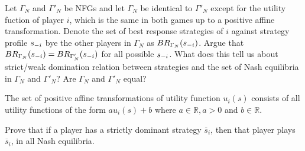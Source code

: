 \documentclass[../main.tex]{subfiles}
\begin{document}
\begin{solution}

\end{solution}

\begin{question}
Let $\Gamma_N$ and $\Gamma'_N$ be NFGs and let $\Gamma_N$  be identical to $\Gamma'_N$ except for the utility fuction of player $i$, which is the same in both games up to a positive affine transformation.
Denote the set of best response strategies of $i$ against strategy profile $s_{\--i}$ bye the other players in $\Gamma_N$  as $BR_{\Gamma_N}(s_{\--i})$.
Argue that $BR_{\Gamma_N}(s_{\--i}) = BR_{\Gamma'_N}(s_{\--i})$ for all possible $s_{\--i}$.
What does this tell us about strict/weak domination relation between strategies and the set of Nash equilibria in $\Gamma_N$ and $\Gamma'_N$? Are $\Gamma_N$ and $\Gamma'_N$ equal?

The set of positive affine transformations of utility function $u_i(s)$ consists of all utility functions of the form $au_i(s) + b$ where $a \in \mathbb{R}, a > 0$ and $b \in \mathbb{R}$.
\end{question}

\begin{solution}

\end{solution}

\begin{question}
	Prove that if a player has a strictly dominant strategy $\overline{s}_i$, then that player plays $\overline{s}_i$, in all Nash equilibria. 
\end{question}
\end{document}
